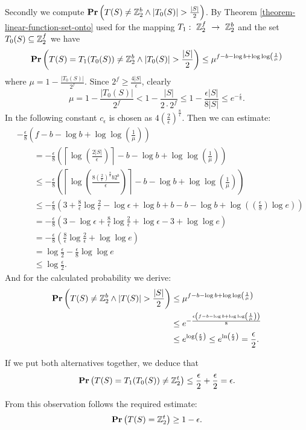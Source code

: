 Secondly we compute $\mathbf{Pr}\left(T(S) \neq \mathbb{Z}_{2}^{b} \wedge |T_0(S)| > \frac{|S|}{2}\right)$. By Theorem \ref{theorem-linear-function-set-onto} used for the mapping $T_1:~\mathbb{Z}_{2}^{f}~\rightarrow~\mathbb{Z}_{2}^{b}$ and the set $T_0(S) \subseteq \mathbb{Z}_{2}^{f}$ we have
\[
	\mathbf{Pr}\left(T(S) = T_1(T_0(S)) \neq \mathbb{Z}_{2}^{b} \wedge |T_0(S)| > \frac{|S|}{2}\right) \leq \mu ^ {f - b - \log b  +\log\log \left(\frac{1}{\mu}\right) } 
\]
where $\mu = 1- \frac{|T_0(S)|}{2 ^ f}$. Since $2 ^ f \geq \frac{4|S|}{\epsilon}$, clearly
\[
\mu = 1 - \frac{|T_0(S)|}{2 ^ f} < 1 - \frac{|S|}{2 \cdot 2 ^ f} \leq 1 - \frac{\epsilon |S|}{8|S|} \leq e^{-\frac{\epsilon}{8}}
\text{.}
\]
In the following constant $c_{\epsilon}$ is chosen as $4\left(\frac{2}{\epsilon}\right) ^ {\frac{8}{\epsilon}}$. Then we can estimate:
\[
\begin{split}
& -\frac{\epsilon}{8} \left(f - b - \log b + \log \log \left( \frac{1}{\mu} \right) \right) \\
& \qquad = -\frac{\epsilon}{8}\left(\left\lceil\log\left(\frac{2|S|}{\epsilon}\right)\right\rceil - b - \log b + \log\log\left(\frac{1}{\mu}\right)\right) \\
& \qquad \leq -\frac{\epsilon}{8} \left( \left\lceil \log\left( \frac{8 \left(\frac{2}{\epsilon}\right) ^ {\frac{8}{\epsilon}}b2^b}{\epsilon} \right) \right\rceil - b - \log b + \log\log\left(\frac{1}{\mu}\right)\right) \\
& \qquad \leq -\frac{\epsilon}{8} \left(3 + \frac{8}{\epsilon}\log\frac{2}{\epsilon} - \log\epsilon + \log b + b - b - \log b + \log \left( \left(\frac{\epsilon}{8}\right)\log e \right) \right) \\
& \qquad = -\frac{\epsilon}{8} \left(3 - \log\epsilon + \frac{8}{\epsilon} \log \frac{2}{\epsilon} + \log\epsilon - 3 + \log\log e\right) \\
& \qquad = -\frac{\epsilon}{8}\left(\frac{8}{\epsilon}\log \frac{2}{\epsilon} + \log\log e\right) \\
& \qquad = \log \frac{\epsilon}{2} - \frac{\epsilon}{8} \log\log e \\
& \qquad \leq \log\frac{\epsilon}{2} \text{.}
\end{split}
\]
And for the calculated probability we derive:
\[
\begin{split}
\mathbf{Pr}\left(T(S) \neq \mathbb{Z}_{2}^{b} \wedge |T(S)| > \frac{|S|}{2}\right) 
	& \leq \mu ^ {f - b - \log b + \log\log\left(\frac{1}{\mu}\right)} \\
	& \leq e ^ {-\frac{\epsilon\left(f - b - \log b + \log\log\left(\frac{1}{\mu}\right)\right)}{8}} \\
	& \leq e ^ {\log \left( \frac{\epsilon}{2} \right)} \leq e ^ {\ln \left(\frac{\epsilon}{2}\right)} = \frac{\epsilon}{2} \text{.}
\end{split}
\]

If we put both alternatives together, we deduce that 
\[ 
	\mathbf{Pr}\left(T(S) = T_1(T_0(S)) \neq \mathbb{Z}_{2}^{t}\right) \leq \frac{\epsilon}{2} + \frac{
\epsilon}{2} = \epsilon \text{.}
\]


From this observation follows the required estimate: \[ \mathbf{Pr}\left(T(S) = \mathbb{Z}_{2}^{t}\right) \geq 1 - \epsilon \text{.} \]
